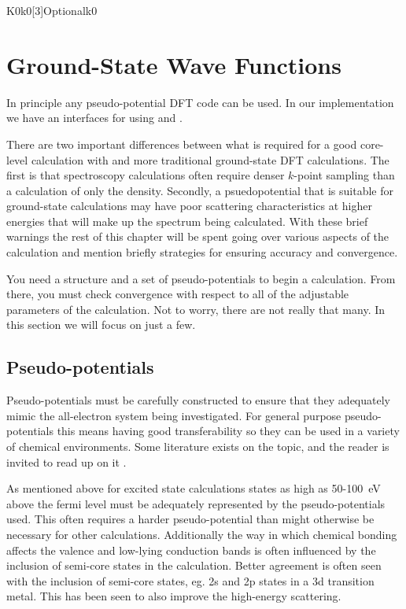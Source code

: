 \documentclass[11pt]{report}
\begin{document}
\begin{Card}{K0}{k0[3]}{Optional}{k0}
\chapter{Ground-State Wave Functions}
\label{ground_state}
In principle any pseudo-potential DFT code can be used. In our implementation we have an interfaces for using 
 \cite{abinit0,abinit1,abinit2,abinit3} and  \cite{espresso1,espresso2}. 

There are two important differences between what is required for a good core-level calculation with  and more traditional ground-state DFT calculations. The first is that spectroscopy calculations often require denser $k$-point sampling than a calculation of only the density. Secondly, a psuedopotential that is suitable for ground-state calculations may have poor scattering characteristics at higher energies that will make up the spectrum being calculated. With these brief warnings the rest of this chapter will be spent going over various aspects of the calculation and mention briefly strategies for ensuring accuracy and convergence.

You need a structure and a set of pseudo-potentials to begin a calculation. From there, you must check convergence with respect to all of the adjustable parameters of the calculation. Not to worry, there are not really that many. In this section we will focus on just a few.

\section{Pseudo-potentials}

Pseudo-potentials must be carefully constructed to ensure that they adequately mimic the all-electron system being investigated. For general purpose pseudo-potentials this means having good transferability so they can be used in a variety of chemical environments. Some literature exists on the topic, and the reader is invited to read up on it\cite{Psp} .

As mentioned above for excited state calculations states as high as 50-100~eV above the fermi level must be adequately represented by the pseudo-potentials used. This often requires a harder pseudo-potential than might otherwise be necessary for 
other calculations. Additionally the way in which chemical bonding affects the valence and low-lying conduction bands is often influenced by the inclusion of semi-core states in the calculation. Better agreement is often seen with the inclusion of semi-core states, eg. 2s and 2p states in a 3d transition metal. This has been seen to also improve the high-energy scattering.\cite{}


\end{Card}
\end{document}
